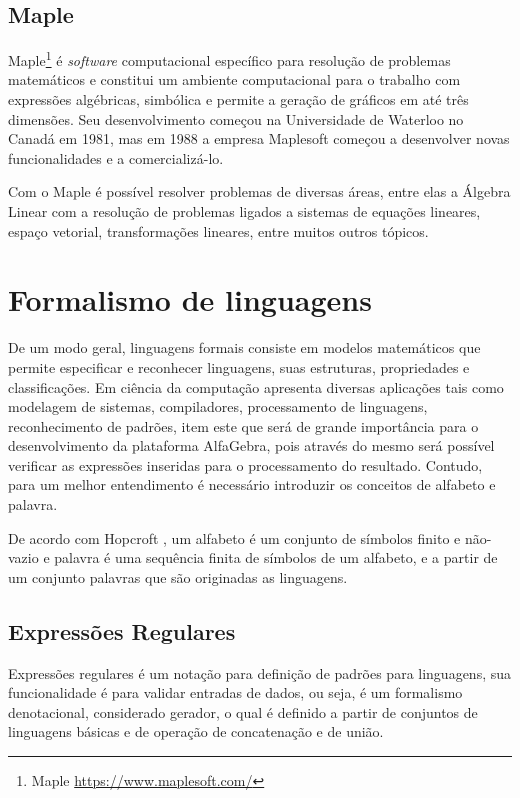 {{\subsection{Maple}
\noindent Maple\footnote[3]{Maple \url{https://www.maplesoft.com/}} é \textit{software} computacional específico para resolução de problemas matemáticos e constitui um ambiente computacional para o trabalho com expressões algébricas, simbólica e permite a geração de gráficos em até três dimensões. Seu desenvolvimento começou na Universidade de Waterloo no Canadá em 1981, mas em 1988 a empresa Maplesoft começou a desenvolver novas funcionalidades e a comercializá-lo. 

Com o Maple é possível resolver problemas de diversas áreas, entre elas a Álgebra Linear com a resolução de problemas ligados a sistemas de equações lineares, espaço vetorial, transformações lineares, entre muitos outros tópicos.

\section{Formalismo de linguagens}
\noindent De um modo geral, linguagens formais consiste em modelos matemáticos que permite especificar e reconhecer linguagens, suas estruturas, propriedades e classificações. Em ciência da computação apresenta diversas aplicações tais como modelagem de sistemas, compiladores, processamento de linguagens, reconhecimento de padrões, item este que será de grande importância para o desenvolvimento da plataforma AlfaGebra, pois através do mesmo será possível verificar as expressões inseridas para o processamento do resultado. Contudo, para um melhor entendimento é necessário introduzir os conceitos de alfabeto e palavra.

De acordo com Hopcroft \cite{2002:John}, um alfabeto é um conjunto de símbolos finito e não-vazio e palavra é uma sequência finita de símbolos de um alfabeto, e a partir de um conjunto palavras que são originadas as linguagens.

\subsection{Expressões Regulares}
\noindent Expressões regulares é um notação para definição de padrões para linguagens, sua funcionalidade é para validar entradas de dados, ou seja, é um formalismo denotacional, considerado gerador, o qual é definido a partir de conjuntos de linguagens básicas e de operação de concatenação e de união.

}}
